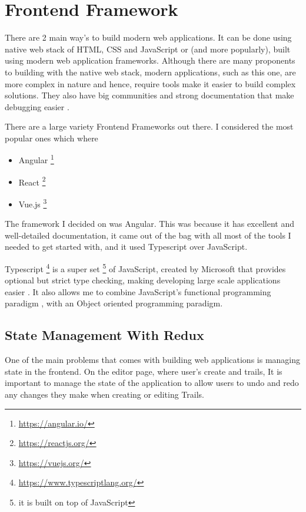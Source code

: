 \section{Frontend Framework} \label{sec:frontendFramework}
There are 2 main way's to build modern web applications. It can be done using native web stack of HTML, CSS and JavaScript or (and more popularly), built using modern web application frameworks. Although there are many proponents to building with the native web stack, modern applications, such as this one, are more complex in nature and hence, require tools make it easier to build complex solutions. They also have big communities and strong documentation that make debugging easier \cite{medium:WhyModernJSFrameworkExist}.

There are a large variety Frontend Frameworks out there. I considered the most popular ones which where
\begin{itemize}
    \item Angular \footnote{\url{https://angular.io/}}
    \item React \footnote{\url{https://reactjs.org/}}
    \item Vue.js \footnote{\url{https://vuejs.org/}}
\end{itemize}

The framework I decided on was Angular. This was because it has excellent and well-detailed documentation, it came out of the bag with all most of the tools I needed to get started with, and it used Typescript over JavaScript.

Typescript \footnote{\url{https://www.typescriptlang.org/}} is a super set \footnote{it is built on top of JavaScript} of JavaScript, created by Microsoft that provides optional but strict type checking, making developing large scale applications easier \cite{bierman2014understanding}. It also allows me to combine JavaScript's functional programming paradigm \cite{hughes1989functional}, with an Object oriented programming paradigm.

\subsection{State Management With Redux}
One of the main problems that comes with building web applications is managing state in the frontend. On the editor page, where user's create and trails, It is important to manage the state of the application to allow users to undo and redo any changes they make when creating or editing Trails.


